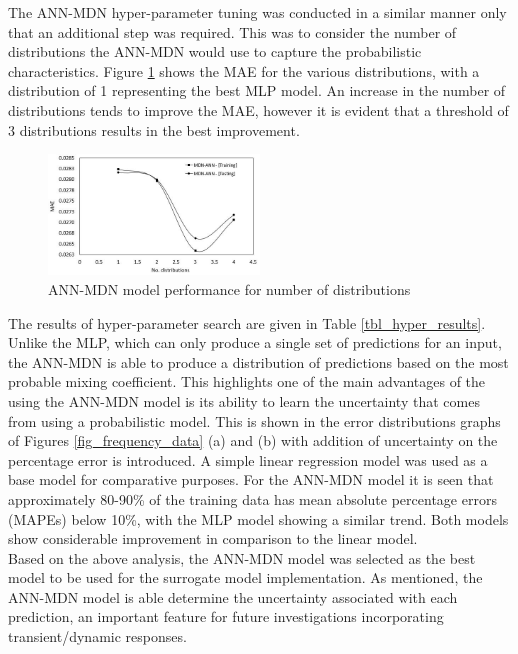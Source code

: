 \documentclass[a4paper,fleqn]{cas-dc}
\begin{document}
The ANN-MDN hyper-parameter tuning was conducted in a similar manner only that an additional step was required. This was to consider the number of distributions the ANN-MDN would use to capture the probabilistic characteristics. Figure \ref{fig_mdn_hyper} shows the MAE for the various distributions, with a distribution of 1 representing the best MLP model. An increase in the number of distributions tends to improve the MAE, however it is evident that a threshold of 3 distributions results in the best improvement.\\
\begin{figure}[h!]
	\centering
		\includegraphics[width=0.5\textwidth]{DIST_HYPER}
	  \caption{ANN-MDN model performance for number of distributions}\label{fig_mdn_hyper}
\end{figure}

The results of hyper-parameter search are given in Table \ref{tbl_hyper_results}. Unlike the MLP, which can only produce a single set of predictions for an input, the ANN-MDN is able to produce a distribution of predictions based on the most probable mixing coefficient. This highlights one of the main advantages of the using the ANN-MDN model is its ability to learn the uncertainty that comes from using a probabilistic model. This is shown in the error distributions graphs of Figures \ref{fig_frequency_data} (a) and (b) with addition of uncertainty on the percentage error is introduced. A simple linear regression model was used as a base model for comparative purposes. For the ANN-MDN model it is seen that approximately 80-90\% of the training data has mean absolute percentage errors (MAPEs) below 10\%, with the MLP model showing a similar trend. Both models show considerable improvement in comparison to the linear model.\\

Based on the above analysis, the ANN-MDN model was selected as the best model to be used for the surrogate model implementation. As mentioned, the ANN-MDN model is able determine the uncertainty associated with each prediction, an important feature for future investigations incorporating transient/dynamic responses.
\end{document}
